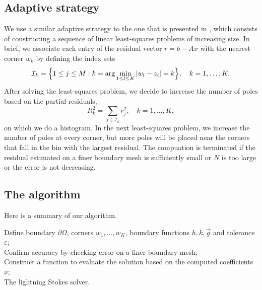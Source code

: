 \subsection{Adaptive strategy}
We use a similar adaptive strategy to the one that is presented in \cite{gopal19}, which consists of constructing a sequence of linear least-squares problems of increasing size. In brief, we associate each entry of the residual vector $r=b-Ax$ with the nearest corner $w_k$ by defining the index sets
\begin{equation}
\mathcal{I}_k = \Big\{1\leq j\leq M : k=\arg\min_{1\leq l \leq K} \abs{w_l-z_i}=k\Big\},\quad k=1,\ldots, K.
\end{equation}
After solving the least-squares problem, we decide to increase the number of poles based on the partial residuals, 
\begin{equation}
R_k^2 = \sum_{j\in \mathcal{I}_k} r_j^2,\quad k=1,\ldots, K,
\end{equation}
on which we do a histogram. In the next least-squares problem, we increase the number of poles at every corner, but more poles will be placed near the corners that fall in the bin with the largest residual. The compuation is terminated if the residual estimated on a finer boundary mesh is sufficiently small or $N$ is too large or the error is not decreasing.


\subsection{The algorithm}
Here is a summary of our algorithm. 

\begin{algorithm}[H]
	\SetAlgoLined
	Define boundary $\partial \Omega$, corners $w_1,\ldots,w_K$, boundary functions $h,k,\vec{g}$ and tolerance $\varepsilon$;\\
	Confirm accuracy by checking error on a finer boundary mesh;\\
	Construct a function to evaluate the solution based on the computed coefficients $x$;\\
	\caption{The lightning Stokes solver.}
\end{algorithm}

